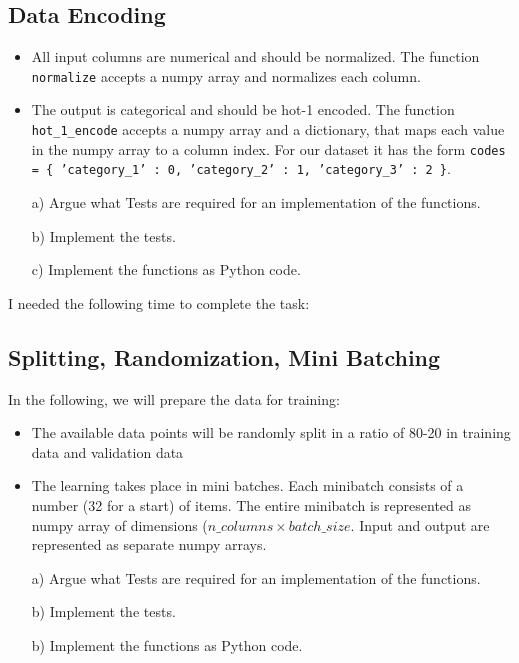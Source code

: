 \subsection{Data Encoding}

\begin{itemize}
\item All input columns are numerical and should be normalized. The function \texttt{normalize} accepts a numpy array and normalizes each column. 
\item The output is categorical and should be hot-1 encoded. The function \texttt{hot\_1\_encode} accepts a numpy array and a dictionary, that maps each value in the numpy array to a column index. For our dataset it has the form \texttt{codes = \{ 'category\_1' : 0, 'category\_2' : 1, 'category\_3' : 2 \}}.
\end{itemize}

\begin{enumerate}

\item[a)] Argue what Tests are required for an implementation of the functions. 

\item[b)] Implement the tests.

\item[c)] Implement the functions as Python code.

\end{enumerate}

I needed the following time to complete the task:

\subsection{Splitting, Randomization, Mini Batching}

In the following, we will prepare the data for training:

\begin{itemize}
\item The available data points will be randomly split in a ratio of 80-20 in training data and validation data
\item The learning takes place in mini batches. Each minibatch consists of a number (32 for a start) of items. The entire minibatch is represented as numpy array of dimensions ($n\_columns \times batch\_size $. Input and output are represented as separate numpy arrays. 
\end{itemize}

\begin{enumerate}

\item[a)] Argue what Tests are required for an implementation of the functions. 

\item[b)] Implement the tests.

\item[b)] Implement the functions as Python code.

\end{enumerate}

